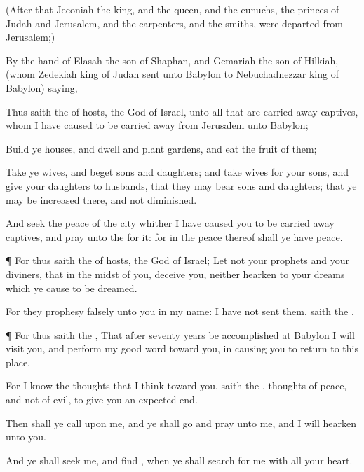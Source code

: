 {(After that
Jeconiah the
king, and the
queen, and the
eunuchs, the
princes of
Judah and
Jerusalem, and the
carpenters, and the
smiths, were
departed from
Jerusalem;)

By the
hand of
Elasah the
son of
Shaphan, and
Gemariah the
son of
Hilkiah, (whom
Zedekiah
king of
Judah
sent unto
Babylon to
Nebuchadnezzar
king of
Babylon)
saying,

Thus
saith the
{} of
hosts, the
God of
Israel, unto all that are carried away
captives, whom I have caused to be carried
away from
Jerusalem unto
Babylon;

Build ye
houses, and
dwell
{} and
plant
gardens, and
eat the
fruit of them;

Take ye
wives, and
beget
sons and
daughters; and
take
wives for your
sons, and
give your
daughters to
husbands, that they may
bear
sons and
daughters; that ye may be
increased there, and not
diminished.

And
seek the
peace of the
city whither I have caused you to be carried away
captives, and
pray unto the
{} for it: for in the
peace thereof shall ye have
peace.


\par }{\PP {}¶ For thus
saith the
{} of
hosts, the
God of
Israel; Let not your
prophets and your
diviners, that
{} in the
midst of you,
deceive you, neither
hearken to your
dreams which ye cause to be
dreamed.

For they
prophesy
falsely unto you in my
name: I have not
sent them,
saith the
{}.


\par }{\PP {}¶ For thus
saith the
{}, That
after
seventy
years be
accomplished at
Babylon I will
visit you, and
perform my
good
word toward you, in causing you to
return to this
place.

For I
know the
thoughts that I
think toward you,
saith the
{},
thoughts of
peace, and not of
evil, to
give you an
expected
end.

Then shall ye
call upon me, and ye shall
go and
pray unto me, and I will
hearken unto you.

And ye shall
seek me, and
find
{}, when ye shall
search for me with all your
heart.

}
